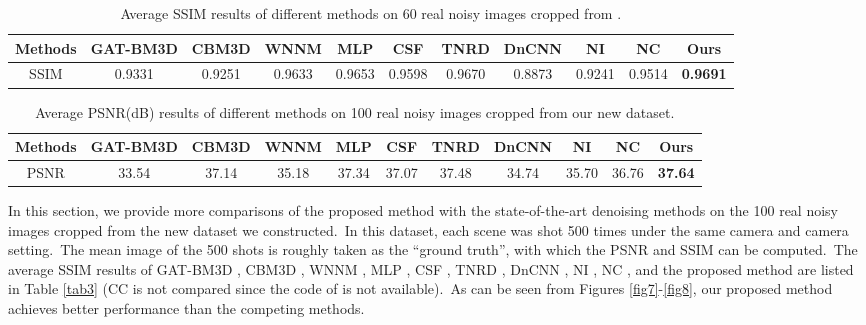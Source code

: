 \begin{table}[htpb]
\begin{adjustwidth}{-2cm}{}
\scriptsize
\caption{Average SSIM \cite{ssim} results of different methods on 60 real noisy images cropped from \cite{crosschannel2016}.}
\label{tab2}
\begin{center}
\renewcommand\arraystretch{1}
\begin{tabular}{|c||c|c|c|c|c|c|c|c|c|c|}
\hline
Methods
&\textbf{GAT-BM3D}
&\textbf{CBM3D}
&\textbf{WNNM}
&\textbf{MLP}
&\textbf{CSF} 
&\textbf{TNRD} 
&\textbf{DnCNN}
&\textbf{NI} 
&\textbf{NC} 
&\textbf{Ours} 
\\
\hline
SSIM  
& 0.9331 & 0.9251 & 0.9633 & 0.9653 & 0.9598 & 0.9670 & 0.8873 & 0.9241 & 0.9514 & \textbf{0.9691}
\\
\hline
\end{tabular}
\end{center}
\end{adjustwidth}
\end{table}




\begin{table}\vspace{-4mm}
\begin{adjustwidth}{-2cm}{}
\scriptsize
\caption{Average PSNR(dB) results of different methods on 100 real noisy images cropped from our new dataset.}
\vspace{-4mm}
\label{tab4}
\begin{center}
\renewcommand\arraystretch{1}
\begin{tabular}{|c||c|c|c|c|c|c|c|c|c|c|}
\hline
Methods
&\textbf{GAT-BM3D}
&\textbf{CBM3D}
&\textbf{WNNM}
&\textbf{MLP}
&\textbf{CSF} 
&\textbf{TNRD} 
&\textbf{DnCNN}
&\textbf{NI} 
&\textbf{NC} 
&\textbf{Ours} 
\\
\hline
PSNR  
& 33.54 & 37.14 & 35.18 & 37.34 & 37.07 & 37.48 & 34.74 & 35.70 & 36.76 & \textbf{37.64}
\\
\hline
\end{tabular}
\end{center}
\end{adjustwidth}
\end{table}

In this section, we provide more comparisons of the proposed method with the state-of-the-art denoising methods on the 100 real noisy images cropped from the new dataset we constructed.\ In this dataset, each scene was shot 500 times under the same camera and camera setting.\ The mean image of the 500 shots is roughly taken as the ``ground truth'', with which the PSNR and SSIM can be computed.\ The average SSIM results of GAT-BM3D \cite{Makitalo2013Optimal}, CBM3D \cite{bm3d}, WNNM \cite{wnnm}, MLP \cite{mlp}, CSF \cite{csf}, TNRD \cite{chen2015learning}, DnCNN \cite{zhang2017beyond}, NI \cite{neatimage}, NC \cite{noiseclinic,ncwebsite}, and the proposed method are listed in Table \ref{tab3} (CC is not compared since the code of \cite{crosschannel2016} is not available).\ As can be seen from Figures \ref{fig7}-\ref{fig8}, our proposed method achieves better performance than the competing methods.



